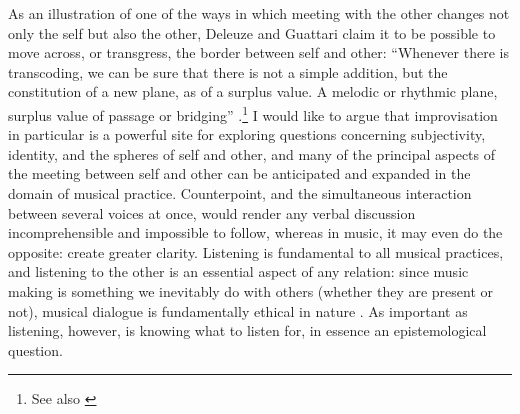 \documentclass[a4paper]{article}
\begin{document}
As an illustration of one of the ways in which meeting with the other changes not only the self but also the other, Deleuze and Guattari claim it to be possible to move across, or transgress, the border between self and other: ``Whenever there is transcoding, we can be sure that there is not a simple addition, but the constitution of a new plane, as of a surplus value. A melodic or rhythmic plane, surplus value of passage or bridging'' \autocite[346]{deleuze80}.\footnote{See also \autocite[][140]{semetsky2011}} I would like to argue that improvisation in particular is a powerful site for exploring questions concerning subjectivity, identity, and the spheres of self and other, and many of the principal aspects of the meeting between self and other can be anticipated and expanded in the domain of musical practice. Counterpoint, and the simultaneous interaction between several voices at once, would render any verbal discussion incomprehensible and impossible to follow, whereas in music, it may even do the opposite: create greater clarity. Listening is fundamental to all musical practices, and listening to the other is an essential aspect of any relation: since music making is something we inevitably do with others (whether they are present or not), musical dialogue is fundamentally ethical in nature \autocite[p. 164]{benson03}. As important as listening, however, is knowing what to listen for, in essence an epistemological question.

\end{document}
